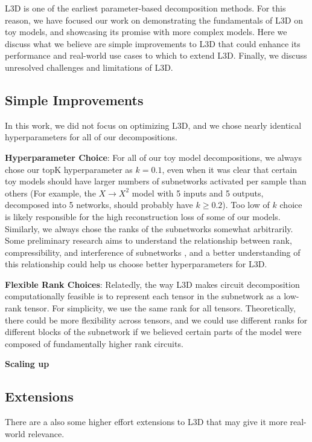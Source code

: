 \documentclass{article}
\theoremstyle{plain}
\theoremstyle{definition}
\theoremstyle{remark}
\begin{document}
L3D is one of the earliest parameter-based decomposition methods. For this reason, we have focused our work on demonstrating the fundamentals of L3D on toy models, and showcasing its promise with more complex models. Here we discuss what we believe are simple improvements to L3D that could enhance its performance and real-world use cases to which to extend L3D. Finally, we discuss unresolved challenges and limitations of L3D. 

\subsection{Simple Improvements}
In this work, we did not focus on optimizing L3D, and we chose nearly identical hyperparameters for all of our decompositions. 

\textbf{Hyperparameter Choice}: For all of our toy model decompositions, we always chose our $\text{topK}$ hyperparameter as $k=0.1$, even when it was clear that certain toy models should have larger numbers of subnetworks activated per sample than others (For example, the $X \rightarrow X^2$ model with 5 inputs and 5 outputs, decomposed into 5 networks, should probably have $k \geq 0.2$). Too low of $k$ choice is likely responsible for the high reconstruction loss of some of our models. Similarly, we always chose the ranks of the subnetworks somewhat arbitrarily. Some preliminary research aims to understand the relationship between rank, compressibility, and interference of subnetworks \cite{hanni2024mathematical,bushnaq2024circuits}, and a better understanding of this relationship could help us choose better hyperparameters for L3D. 

\textbf{Flexible Rank Choices}: Relatedly, the way L3D makes circuit decomposition computationally feasible is to represent each tensor in the subnetwork as a low-rank tensor. For simplicity, we use the same rank for all tensors. Theoretically, there could be more flexibility across tensors, and we could use different ranks for different blocks of the subnetwork if we believed certain parts of the model were composed of fundamentally higher rank circuits. 

\textbf{Scaling up}


\subsection{Extensions}

There are a also some higher effort extensions to L3D that may give it more real-world relevance. 
\end{document}
